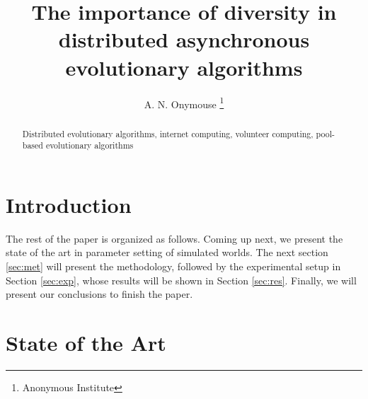 \documentclass[runningheads,a4paper]{llncs}
\newcommand{\keywords}[1]{\par\addvspace\baselineskip
\noindent\keywordname\enspace\ignorespaces#1}
\begin{document}
\mainmatter  

\title{The importance of diversity in distributed asynchronous
  evolutionary algorithms} 


\author{A. N. Onymouse%
\thanks{Anonymous Institute}}
%




\maketitle

\begin{abstract}

\keywords{Distributed evolutionary algorithms, internet computing,
  volunteer computing, pool-based evolutionary algorithms}
\end{abstract}

\section{Introduction}

The rest of the paper is organized as follows. Coming up next, we
present the state of the art in parameter setting of simulated
worlds. The next section \ref{sec:met} will present the methodology,
followed by the experimental setup in Section \ref{sec:exp}, whose results will be shown in Section \ref{sec:res}. Finally, we will
present our conclusions to finish the paper.


\section{State of the Art}
\label{sec:sota}

\end{document}
